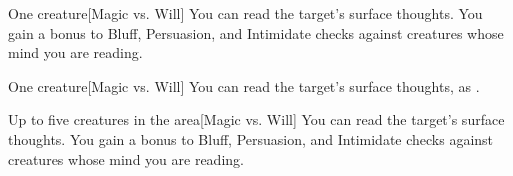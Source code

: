 \begin{comment}
\subsubsection{Q-R}
\end{comment}

\spellrng{\rngmed}
\begin{spelltarget}{One creature}[Magic vs. Will]
    \spellsuccess You can read the target's surface thoughts. You gain a  bonus to Bluff, Persuasion, and Intimidate checks against creatures whose mind you are reading.
\end{spelltarget}

\spellrng{\rngmed}
\begin{spelltarget}{One creature}[Magic vs. Will]
    \spelleffect You can read the target's surface thoughts, as .
\end{spelltarget}

\begin{spelltargets}{Up to five creatures in the area}[Magic vs. Will]
    \spellsuccess You can read the target's surface thoughts. You gain a  bonus to Bluff, Persuasion, and Intimidate checks against creatures whose mind you are reading.
\end{spelltargets}

